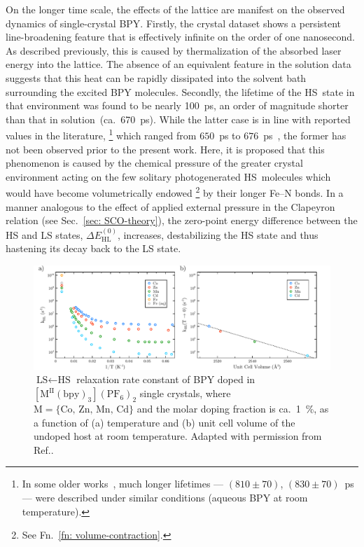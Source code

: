 On the longer time scale, the effects of the lattice are manifest
on the observed dynamics of single-crystal BPY.
%
Firstly, the crystal dataset shows a persistent line-broadening feature
that is effectively infinite on the order of one nanosecond.
As described previously, this is caused by thermalization of the absorbed laser energy
into the lattice. The absence of an equivalent feature in the solution data
suggests that this heat can be rapidly dissipated into the solvent bath
surrounding the excited BPY molecules.
%
Secondly, the lifetime of the HS~state in that environment was found to be nearly 100~ps,
an order of magnitude shorter than that in solution~(ca.~670~ps).
While the latter case is in line with reported values in the literature,%
\footnote{In some older works~\cite{Kirk1976, Creutz1980},
much longer lifetimes --- $(810 \pm 70)$, $(830 \pm 70)$~ps ---
were described under similar conditions (aqueous BPY at room temperature).}
which ranged from $650$~ps to $676$~ps~\cite{McCusker1992, Gawelda2007a, Consani2009},
the former has not been observed prior to the present work.
%
Here, it is proposed that this phenomenon is caused by the chemical pressure
of the greater crystal environment acting on the few solitary photogenerated HS~molecules
which would have become volumetrically endowed%
\footnote{See Fn.~\ref{fn: volume-contraction}.} by their longer Fe--N bonds.
%
In a manner analogous to the effect of applied external pressure
in the Clapeyron relation (see Sec.~\ref{sec: SCO-theory}),
the zero-point energy difference between the HS and LS states, $\Delta E_\text{HL}^{(0)}$,
increases, destabilizing the HS state and thus hastening its decay back to the LS state.

\begin{figure}[t!]
  \centering
  \includegraphics[width = \textwidth]{Figures/fig_BPY_hostlattice.pdf}
  \caption[$\text{LS} \leftarrow \text{HS}$ relaxation rate constant of
    BPY doped in $\mathrm{[M^{II}(bpy)_3](PF_6)_2}$ single crystals.]{
    $\text{LS} \leftarrow \text{HS}$ relaxation rate constant of
    BPY doped in $\mathrm{[M^{II}(bpy)_3](PF_6)_2}$ single crystals,
    where $\text{M} = \{ \text{Co, Zn, Mn, Cd} \}$
    and the molar doping fraction is ca.~1~\%,
    as a function of
    (a) temperature and
    (b) unit cell volume of the undoped host at room temperature.
    Adapted with permission from Ref.\cite{Schenker1998}.
  }
  \label{fig: BPY-hostlattice}
\end{figure}

